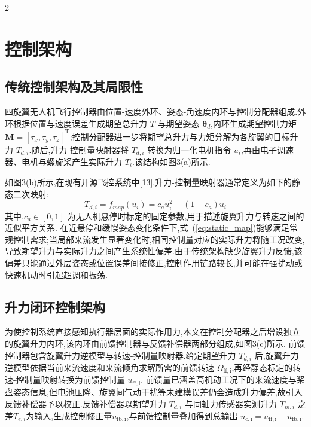 \documentclass{aas}
\begin{document}
\begin{multicols}{2}
\section{控制架构}
\label{sec:control}

\subsection{传统控制架构及其局限性}
\label{subsec:conventional}

四旋翼无人机飞行控制器由位置-速度外环、姿态-角速度内环与控制分配器组成.外环根据位置与速度误差生成期望总升力 $T$ 与期望姿态 $\bm{\theta}_d$,内环生成期望控制力矩 $\bm{M}=[\tau_x,\tau_y,\tau_z]^{\mathrm{T}}$;控制分配器进一步将期望总升力与力矩分解为各旋翼的目标升力 $T_{d,i}$.随后,升力-控制量映射器将 $T_{d,i}$ 转换为归一化电机指令 $u_i$,再由电子调速器、电机与螺旋桨产生实际升力 $T_i$.该结构如图3(a)所示.

如图3(b)所示,在现有开源飞控系统中[13],升力-控制量映射器通常定义为如下的静态二次映射:
\begin{equation}
T_{d,i}=f_{map}(u_i)=c_a u_i^2+(1-c_a)u_i
\label{eq:static_map}
\end{equation}
其中,$c_a\in[0,1]$ 为无人机悬停时标定的固定参数,用于描述旋翼升力与转速之间的近似平方关系.
在近悬停和缓慢姿态变化条件下,式~(\ref{eq:static_map})能够满足常规控制需求;当局部来流发生显著变化时,相同控制量对应的实际升力将随工况改变,导致期望升力与实际升力之间产生系统性偏差.由于传统架构缺少旋翼升力反馈,该偏差只能通过外层姿态或位置误差间接修正,控制作用链路较长,并可能在强扰动或快速机动时引起超调和振荡.

\subsection{升力闭环控制架构}
\label{subsec:closed_loop}

为使控制系统直接感知执行器层面的实际作用力,本文在控制分配器之后增设独立的旋翼升力内环,该内环由前馈控制器与反馈补偿器两部分组成,如图3(c)所示.
前馈控制器包含旋翼升力逆模型与转速-控制量映射器.给定期望升力 $T_{d,i}$ 后,旋翼升力逆模型依据当前来流速度和来流倾角求解所需的前馈转速 $\Omega_{\mathrm{ff,i}}$,再经静态标定的转速-控制量映射转换为前馈控制量 $u_{\mathrm{ff,i}}$.
前馈量已涵盖高机动工况下的来流速度与桨盘姿态信息,但电池压降、旋翼间气动干扰等未建模误差仍会造成升力偏差,故引入反馈补偿器予以校正.反馈补偿器以期望升力 $T_{d,i}$ 与同轴力传感器实测升力 $T_{m,i}$ 之差$T_{e,i}$为输入,生成控制修正量$u_{\mathrm{fb,i}}$,与前馈控制量叠加得到总输出 $u_{\mathrm{c,i}}=u_{\mathrm{ff,i}}+u_{\mathrm{fb,i}}$.

\end{multicols}%
\end{document}
